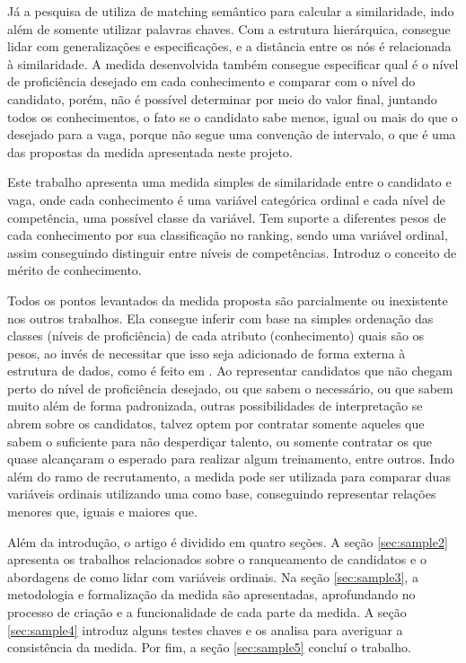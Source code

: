 \documentclass[preprint,12pt]{elsarticle}
\begin{document}
Já a pesquisa de \cite{impact-semantic-web-2005} utiliza de matching semântico para calcular a similaridade, indo além de somente utilizar palavras chaves. Com a estrutura hierárquica, consegue lidar com generalizações e especificações, e a distância entre os nós é relacionada à similaridade. A medida desenvolvida também consegue especificar qual é o nível de proficiência desejado em cada conhecimento e comparar com o nível do candidato, porém, não é possível determinar por meio do valor final, juntando todos os conhecimentos, o fato se o candidato sabe menos, igual ou mais do que o desejado para a vaga, porque não segue uma convenção de intervalo, o que é uma das propostas da medida apresentada neste projeto.

Este trabalho apresenta uma medida simples de similaridade entre o candidato e vaga, onde cada conhecimento é uma variável categórica ordinal e cada nível de competência, uma possível classe da variável. Tem suporte a diferentes pesos de cada conhecimento por sua classificação no ranking, sendo uma variável ordinal, assim conseguindo distinguir entre níveis de competências. Introduz o conceito de mérito de conhecimento.

Todos os pontos levantados da medida proposta são parcialmente ou inexistente nos outros trabalhos. Ela consegue inferir com base na simples ordenação das classes (níveis de proficiência) de cada atributo (conhecimento) quais são os pesos, ao invés de necessitar que isso seja adicionado de forma externa à estrutura de dados, como é feito em \cite{impact-semantic-web-2005}. Ao representar candidatos que não chegam perto do nível de proficiência desejado, ou que sabem o necessário, ou que sabem muito além de forma padronizada, outras possibilidades de interpretação se abrem sobre os candidatos, talvez optem por contratar somente aqueles que sabem o suficiente para não desperdiçar talento, ou somente contratar os que quase alcançaram o esperado para realizar algum treinamento, entre outros. Indo além do ramo de recrutamento, a medida pode ser utilizada para comparar duas variáveis ordinais utilizando uma como base, conseguindo representar relações menores que, iguais e maiores que.

Além da introdução, o artigo é dividido em quatro seções. A seção \ref{sec:sample2} apresenta os trabalhos relacionados sobre o ranqueamento de candidatos e o abordagens de como lidar com variáveis ordinais. Na seção \ref{sec:sample3}, a metodologia e formalização da medida são apresentadas, aprofundando no processo de criação e a funcionalidade de cada parte da medida. A seção \ref{sec:sample4} introduz alguns testes chaves e os analisa para averiguar a consistência da medida. Por fim, a seção \ref{sec:sample5} concluí o trabalho.
\end{document}
